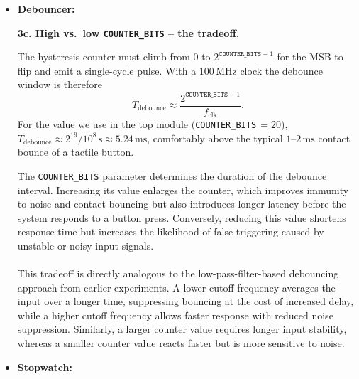 \documentclass[11pt,a4paper]{article}
\begin{document}
\begin{itemize}[topsep=4pt,itemsep=8pt,leftmargin=1.5em]
\textbf{2d.ii Mealy vs.\ Moore.} The assignment draws the FSM in Mealy form (each arrow shows \emph{both} inputs and outputs). However, all transitions \emph{leaving the same state} carry the \emph{same output}:
\begin{itemize}[noitemsep,topsep=2pt]
    \item every arrow leaving \texttt{IDLE} outputs \texttt{init\_regs,count\_enabled = 10},
    \item every arrow leaving \texttt{COUNTING} outputs \texttt{01},
    \item every arrow leaving \texttt{PAUSED} outputs \texttt{00}.
\end{itemize}
The output therefore depends only on the current state, so this FSM is in fact a \textbf{Moore} FSM. This is exactly how the output is written in \texttt{Ctl.v}:
\[
\texttt{init\_regs} = (\texttt{state} == \texttt{IDLE}), \qquad
\texttt{count\_enabled} = (\texttt{state} == \texttt{COUNTING}).
\]

\vspace{2cm}
\item \textbf{Debouncer:}

\textbf{3c. High vs.\ low \texttt{COUNTER\_BITS} -- the tradeoff.}

The hysteresis counter must climb from $0$ to $2^{\texttt{COUNTER\_BITS}-1}$ for the MSB to flip and emit a single-cycle pulse. With a $100\,\text{MHz}$ clock the debounce window is therefore
\[
T_{\text{debounce}} \approx \frac{2^{\texttt{COUNTER\_BITS}-1}}{f_{\text{clk}}}.
\]
For the value we use in the top module (\texttt{COUNTER\_BITS}\,$= 20$), $T_{\text{debounce}} \approx 2^{19}/10^{8}\,\text{s} \approx 5.24\,\text{ms}$, comfortably above the typical $1$--$2\,\text{ms}$ contact bounce of a tactile button.


The \texttt{COUNTER\_BITS} parameter determines the duration of the debounce interval. Increasing its value enlarges the counter, which improves immunity to noise and contact bouncing but also introduces longer latency before the system responds to a button press. Conversely, reducing this value shortens response time but increases the likelihood of false triggering caused by unstable or noisy input signals.\\\\This tradeoff is directly analogous to the low-pass-filter-based debouncing approach from earlier experiments. A lower cutoff frequency averages the input over a longer time, suppressing bouncing at the cost of increased delay, while a higher cutoff frequency allows faster response with reduced noise suppression. Similarly, a larger counter value requires longer input stability, whereas a smaller counter value reacts faster but is more sensitive to noise.
\newpage
\newpage
\item \textbf{Stopwatch:}


\end{itemize}
\end{document}
